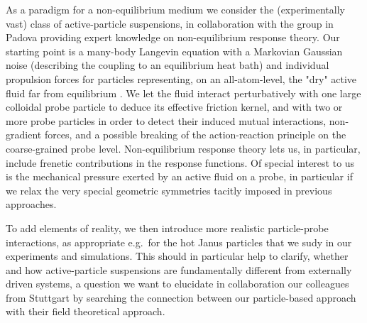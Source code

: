 \begin{workpackage}
\begin{tasklist}

\begin{task}[title=Non-Equilibrium Equations of State (NEOS),id=task1,PM=8,lead=Leipzig,partners={Padova,USTUTT},wphases=0-48!0.3]
As a paradigm for a non-equilibrium medium we consider the (experimentally vast) class of
active-particle suspensions, in collaboration with the group in Padova providing expert knowledge on 
non-equilibrium response theory.
%
Our starting point is a many-body Langevin equation with a Markovian Gaussian noise
(describing the coupling to an equilibrium heat bath) and individual propulsion forces for
particles representing, on an all-atom-level, the "dry" active fluid far from equilibrium \cite{solon-etal.2015}. 
%
We let the fluid interact perturbatively with one large colloidal probe particle to
deduce its effective friction kernel, and with two or more probe particles in order to
detect their induced mutual interactions, non-gradient forces, and a possible breaking of
the action-reaction principle on the coarse-grained probe level.  
%
Non-equilibrium response theory lets us, in particular, include frenetic contributions in the response functions.
%
Of special interest to us is the mechanical pressure exerted by an active fluid on a probe, 
in particular if we relax the very special geometric symmetries tacitly imposed in previous approaches.

To add elements of reality, we then introduce more realistic particle-probe interactions, as appropriate e.g.\ for the hot 
Janus particles that we sudy in our experiments and simulations.
%
This should in particular help to clarify, whether and how active-particle suspensions are fundamentally different
from externally driven systems, a question we want to elucidate in collaboration our colleagues from Stuttgart 
by searching the connection between our particle-based approach with their field theoretical approach.

\end{task}


\end{tasklist}
\end{workpackage}
